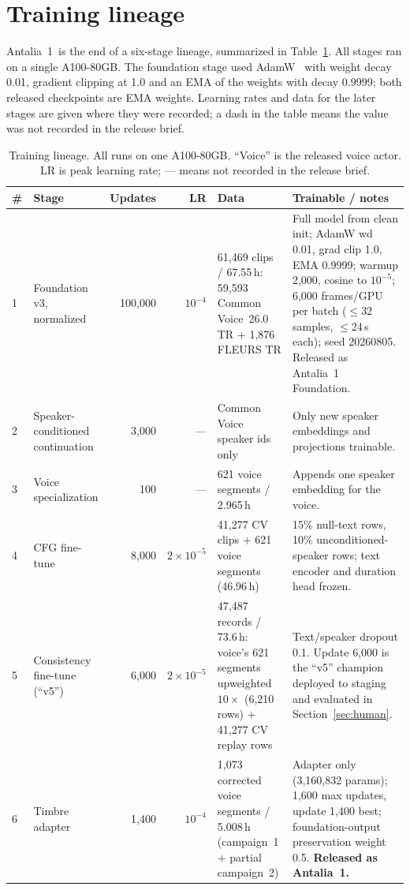 \documentclass[10pt,twocolumn]{article}
\newcommand{\antalia}{Antalia~1}
\newcommand{\foundation}{Antalia~1 Foundation}
\begin{document}
\section{Training lineage}
\label{sec:training}

\antalia\ is the end of a six-stage lineage, summarized in Table~\ref{tab:lineage}. All stages ran on a single A100-80GB. The foundation stage used AdamW~\citep{loshchilov2019adamw} with weight decay 0.01, gradient clipping at 1.0 and an EMA of the weights with decay 0.9999; both released checkpoints are EMA weights. Learning rates and data for the later stages are given where they were recorded; a dash in the table means the value was not recorded in the release brief.

\begin{table}[t]
\centering
\footnotesize
\caption{Training lineage. All runs on one A100-80GB. ``Voice'' is the released voice actor. LR is peak learning rate; --- means not recorded in the release brief.}
\label{tab:lineage}
\begin{tabular}{@{}lp{3.0cm}rrp{5.4cm}p{4.6cm}@{}}
\toprule
\# & Stage & Updates & LR & Data & Trainable / notes \\
\midrule
1 & Foundation v3, normalized & 100,000 & $10^{-4}$ & 61,469 clips / 67.55\,h: 59,593 Common Voice~26.0 TR + 1,876 FLEURS TR & Full model from clean init; AdamW wd 0.01, grad clip 1.0, EMA 0.9999; warmup 2,000, cosine to $10^{-5}$; 6,000 frames/GPU per batch ($\le$32 samples, $\le$24\,s each); seed 20260805. Released as \foundation. \\
2 & Speaker-conditioned continuation & 3,000 & --- & Common Voice speaker ids only & Only new speaker embeddings and projections trainable. \\
3 & Voice specialization & 100 & --- & 621 voice segments / 2.965\,h & Appends one speaker embedding for the voice. \\
4 & CFG fine-tune & 8,000 & $2\times10^{-5}$ & 41,277 CV clips + 621 voice segments (46.96\,h) & 15\% null-text rows, 10\% unconditioned-speaker rows; text encoder and duration head frozen. \\
5 & Consistency fine-tune (``v5'') & 6,000 & $2\times10^{-5}$ & 47,487 records / 73.6\,h: voice's 621 segments upweighted $10\times$ (6,210 rows) + 41,277 CV replay rows & Text/speaker dropout 0.1. Update 6,000 is the ``v5'' champion deployed to staging and evaluated in Section~\ref{sec:human}. \\
6 & Timbre adapter & 1,400 & $10^{-4}$ & 1,073 corrected voice segments / 5.008\,h (campaign~1 + partial campaign~2) & Adapter only (3,160,832 params); 1,600 max updates, update 1,400 best; foundation-output preservation weight 0.5. \textbf{Released as \antalia.} \\
\bottomrule
\end{tabular}
\end{table}
\end{document}
